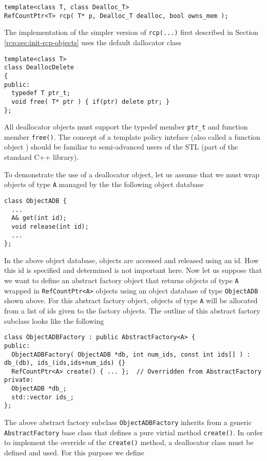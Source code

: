 {\scriptsize\begin{verbatim}
template<class T, class Dealloc_T>
RefCountPtr<T> rcp( T* p, Dealloc_T dealloc, bool owns_mem );
\end{verbatim}}

The implementation of the simpler version of {}\texttt{rcp(...)} first
described in Section {}\ref{rcp:sec:init-rcp-objects} uses the default
dallocator class

{\scriptsize\begin{verbatim}
template<class T>
class DeallocDelete
{
public:
  typedef T ptr_t;
  void free( T* ptr ) { if(ptr) delete ptr; }
};
\end{verbatim}}

All deallocator objects must support the typedef member
{}\texttt{ptr\_t} and function member {}\texttt{free()}.  The concept
of a template policy inteface (also called a function object
\cite[Section 18.4]{ref:stroustrup_2000}) should be familiar to
semi-advanced users of the STL (part of the standard C++ library).

To demonstrate the use of a deallocator object, let us assume that we
must wrap objects of type {}\texttt{A} managed by the the following
object database

{\scriptsize\begin{verbatim}
class ObjectADB {
  ...
  A& get(int id);
  void release(int id);
  ...
};
\end{verbatim}}

In the above object database, objects are accessed and released using
an id.  How this id is specified and determined is not important here.
Now let us suppose that we want to define an abstract factory object
that returns objects of type {}\texttt{A} wrapped in
{}\texttt{RefCountPtr<A>} objects using an object database of type
{}\texttt{ObjectADB} shown above.  For this abstract factory object,
objects of type {}\texttt{A} will be allocated from a list of ids
given to the factory objects.  The outline of this abstract factory
subclass looks like the following

{\scriptsize\begin{verbatim}
class ObjectADBFactory : public AbstractFactory<A> {
public:
  ObjectADBFactory( ObjectADB *db, int num_ids, const int ids[] ) : db_(db), ids_(ids,ids+num_ids) {}
  RefCountPtr<A> create() { ... };  // Overridden from AbstractFactory
private:
  ObjectADB *db_;
  std::vector ids_;
};
\end{verbatim}}

The above abstract factory subclass {}\texttt{ObjectADBFactory}
inherits from a generic {}\texttt{AbstractFactory} base class that
defines a pure virtial method {}\texttt{create()}.  In order to
implement the override of the {}\texttt{create()} method, a
deallocator class must be defined and used.  For this purpose we
define

